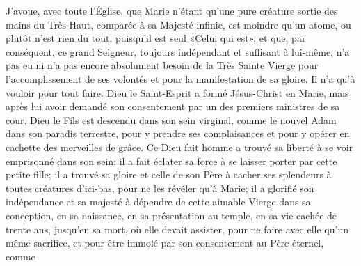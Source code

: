 J'avoue, avec toute l'Église, que Marie n'étant qu'une pure créature sortie des mains du Très-Haut, comparée
à sa Majesté infinie, est moindre qu'un atome, ou plutôt n'est rien du tout, puisqu'il est seul «Celui qui est», et que,
par conséquent, ce grand Seigneur, toujours indépendant et suffisant à lui-même, n'a pas eu ni n'a pas encore
absolument besoin de la Très Sainte Vierge pour l'accomplissement de ses volontés et pour la manifestation de sa
gloire. Il n'a qu'à vouloir pour tout faire.
 
 
Dieu le Saint-Esprit a formé Jésus-Christ en Marie, mais après lui avoir demandé son consentement par un des
premiers ministres de sa cour.
 
 Dieu le Fils est descendu dans son sein virginal, comme le nouvel Adam dans son paradis terrestre, pour y
prendre ses complaisances et pour y opérer en cachette des merveilles de grâce. Ce Dieu fait homme a trouvé sa
liberté à se voir emprisonné dans son sein; il a fait éclater sa force à se laisser porter par cette petite fille; il a
trouvé sa gloire et celle de son Père à cacher ses splendeurs à toutes créatures d'ici-bas, pour ne les révéler qu'à
Marie; il a glorifié son indépendance et sa majesté à dépendre de cette aimable Vierge dans sa conception, en sa
naissance, en sa présentation au temple, en sa vie cachée de trente ans, jusqu'en sa mort, où elle devait assister,
pour ne faire avec elle qu'un même sacrifice, et pour être immolé par son consentement au Père éternel, comme
